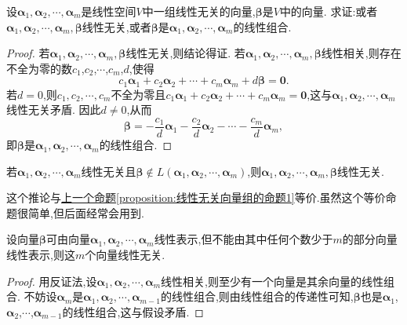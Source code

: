 \documentclass[../../main.tex]{subfiles}
\begin{document}
\begin{proposition}\label{proposition:线性无关向量组的命题1}
设\(\boldsymbol{\alpha}_1,\boldsymbol{\alpha}_2,\cdots,\boldsymbol{\alpha}_m\)是线性空间\(V\)中一组线性无关的向量,\(\boldsymbol{\beta}\)是\(V\)中的向量. 求证:或者\(\boldsymbol{\alpha}_1,\boldsymbol{\alpha}_2,\cdots,\boldsymbol{\alpha}_m,\boldsymbol{\beta}\)线性无关,或者\(\boldsymbol{\beta}\)是\(\boldsymbol{\alpha}_1,\boldsymbol{\alpha}_2,\cdots,\boldsymbol{\alpha}_m\)的线性组合.
\end{proposition}
\begin{proof}
若\(\boldsymbol{\alpha}_1,\boldsymbol{\alpha}_2,\cdots,\boldsymbol{\alpha}_m,\boldsymbol{\beta}\)线性无关,则结论得证. 若\(\boldsymbol{\alpha}_1,\boldsymbol{\alpha}_2,\cdots,\boldsymbol{\alpha}_m,\boldsymbol{\beta}\)线性相关,则存在不全为零的数$c_1$,$c_2$,$\cdots$,$c_m$,$d$,使得
\[
c_1\boldsymbol{\alpha}_1 + c_2\boldsymbol{\alpha}_2+\cdots + c_m\boldsymbol{\alpha}_m + d\boldsymbol{\beta}=\boldsymbol{0}.
\]
若\(d = 0\),则\(c_1,c_2,\cdots,c_m\)不全为零且\(c_1\boldsymbol{\alpha}_1 + c_2\boldsymbol{\alpha}_2+\cdots + c_m\boldsymbol{\alpha}_m=\boldsymbol{0}\),这与\(\boldsymbol{\alpha}_1,\boldsymbol{\alpha}_2,\cdots,\boldsymbol{\alpha}_m\)线性无关矛盾. 因此\(d\neq0\),从而
\[
\boldsymbol{\beta}=-\frac{c_1}{d}\boldsymbol{\alpha}_1-\frac{c_2}{d}\boldsymbol{\alpha}_2-\cdots-\frac{c_m}{d}\boldsymbol{\alpha}_m,
\]
即\(\boldsymbol{\beta}\)是\(\boldsymbol{\alpha}_1,\boldsymbol{\alpha}_2,\cdots,\boldsymbol{\alpha}_m\)的线性组合.
\end{proof}

\begin{corollary}\label{corollary:线性无关向量组的命题1}
若\(\boldsymbol{\alpha}_1,\boldsymbol{\alpha}_2,\cdots,\boldsymbol{\alpha}_m\)线性无关且\(\boldsymbol{\beta}\notin L(\boldsymbol{\alpha}_1,\boldsymbol{\alpha}_2,\cdots,\boldsymbol{\alpha}_m)\),则\(\boldsymbol{\alpha}_1,\boldsymbol{\alpha}_2,\cdots,\boldsymbol{\alpha}_m,\boldsymbol{\beta}\)线性无关. 
\end{corollary}
\begin{note}
这个推论与\hyperref[proposition:线性无关向量组的命题1]{上一个命题\ref{proposition:线性无关向量组的命题1}}等价.虽然这个等价命题很简单,但后面经常会用到.
\end{note}

\begin{proposition}\label{proposition:线性无关向量组的命题2}
设向量\(\boldsymbol{\beta}\)可由向量\(\boldsymbol{\alpha}_1,\boldsymbol{\alpha}_2,\cdots,\boldsymbol{\alpha}_m\)线性表示,但不能由其中任何个数少于\(m\)的部分向量线性表示,则这\(m\)个向量线性无关.
\end{proposition}
\begin{proof}
用反证法,设\(\boldsymbol{\alpha}_1,\boldsymbol{\alpha}_2,\cdots,\boldsymbol{\alpha}_m\)线性相关,则至少有一个向量是其余向量的线性组合. 不妨设\(\boldsymbol{\alpha}_m\)是\(\boldsymbol{\alpha}_1,\boldsymbol{\alpha}_2,\cdots,\boldsymbol{\alpha}_{m - 1}\)的线性组合,则由线性组合的传递性可知,\(\boldsymbol{\beta}\)也是$\boldsymbol{\alpha}_1$,$\boldsymbol{\alpha}_2$,$\cdots$,$\boldsymbol{\alpha}_{m - 1}$的线性组合,这与假设矛盾. 
\end{proof}
\end{document}
